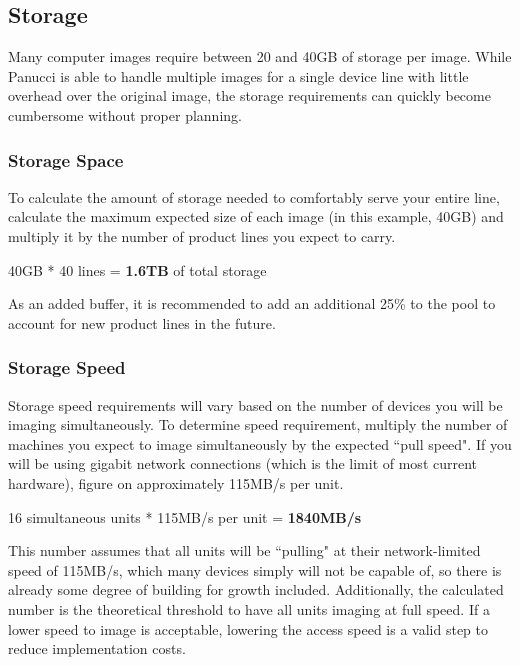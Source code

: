\documentclass{article}
\begin{document}
\subsection{Storage}
Many computer images require between 20 and 40GB of storage per image.  While Panucci is able to handle multiple images for a single device line with little overhead over the original image, the storage requirements can quickly become cumbersome without proper planning.

\subsubsection{Storage Space}
To calculate the amount of storage needed to comfortably serve your entire line, calculate the maximum expected size of each image (in this example, 40GB) and multiply it by the number of product lines you expect to carry.
\begin{center}
40GB * 40 lines = \textbf{1.6TB} of total storage
\end{center}
As an added buffer, it is recommended to add an additional 25\% to the pool to account for new product lines in the future.
\subsubsection{Storage Speed}
Storage speed requirements will vary based on the number of devices you will be imaging simultaneously.
To determine speed requirement, multiply the number of machines you expect to image simultaneously by the expected ``pull speed".  If you will be using gigabit network connections (which is the limit of most current hardware), figure on approximately 115MB/s per unit.
\begin{center}
  16 simultaneous units * 115MB/s per unit = \textbf{1840MB/s}
\end{center}
This number assumes that all units will be ``pulling" at their network-limited speed of 115MB/s, which many devices simply will not be capable of, so there is already some degree of building for growth included.\linebreak
Additionally, the calculated number is the theoretical threshold to have all units imaging at full speed.  If a lower speed to image is acceptable, lowering the access speed is a valid step to reduce implementation costs.\linebreak\linebreak
\end{document}
